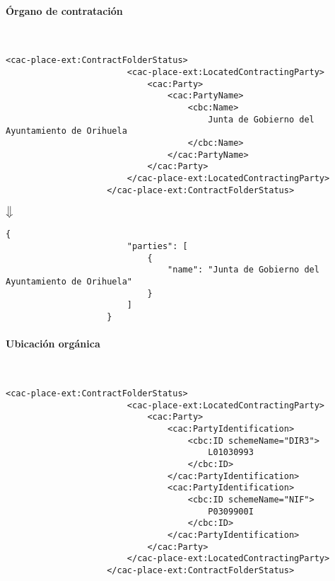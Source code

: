             \paragraph{Órgano de contratación} \mbox{}\\
                \begin{lstlisting}[language=lXML]
                    <cac-place-ext:ContractFolderStatus>
                        <cac-place-ext:LocatedContractingParty>
                            <cac:Party>
                                <cac:PartyName>
                                    <cbc:Name>
                                        Junta de Gobierno del Ayuntamiento de Orihuela
                                    </cbc:Name>
                                </cac:PartyName>
                            </cac:Party>
                        </cac-place-ext:LocatedContractingParty>
                    </cac-place-ext:ContractFolderStatus>
                \end{lstlisting}
                
                \begin{center}
                    $\big\Downarrow$
                \end{center}
                
                \begin{lstlisting}[language=lJSON]
                    {
                        "parties": [
                            {
                                "name": "Junta de Gobierno del Ayuntamiento de Orihuela"
                            }
                        ]
                    }
                \end{lstlisting}
                
            \paragraph{Ubicación orgánica} \mbox{}\\
                \begin{lstlisting}[language=lXML]
                    <cac-place-ext:ContractFolderStatus>
                        <cac-place-ext:LocatedContractingParty>
                            <cac:Party>
                                <cac:PartyIdentification>
                                    <cbc:ID schemeName="DIR3">
                                        L01030993
                                    </cbc:ID>
                                </cac:PartyIdentification>
                                <cac:PartyIdentification>
                                    <cbc:ID schemeName="NIF">
                                        P0309900I
                                    </cbc:ID>
                                </cac:PartyIdentification>
                            </cac:Party>
                        </cac-place-ext:LocatedContractingParty>
                    </cac-place-ext:ContractFolderStatus>
                \end{lstlisting}
                
